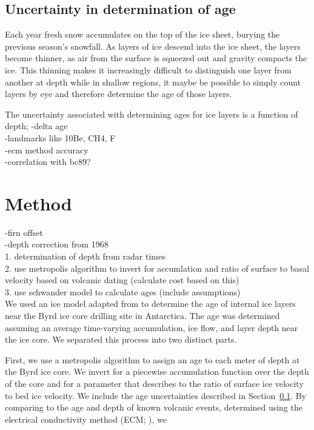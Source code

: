 \documentclass[draft,jgrga]{agutex}
\begin{document}
\subsection{Uncertainty in determination of age}\label{ageunc}

Each year fresh snow accumulates on the top of the ice sheet,
burying the previous season's snowfall. As layers of ice descend into
the ice sheet, the layers become thinner, as air from the surface is
squeezed out and gravity compacts the ice. This thinning makes it
increasingly difficult to distinguish one layer from another at
depth while in shallow regions, it maybe be possible to simply count
layers by eye and therefore determine the age of those layers. 

The uncertainty associated with determining ages for ice layers is a
function of depth;
-delta age \\
-landmarks like 10Be, CH4, F \\
-ecm method accuracy \\
-correlation with bc89? \\

\section{Method}\label{method}
-firn offset \\
-depth correction from 1968  \\
1. determination of depth from radar times \\
2. use metropolis algorithm to invert for accumlation and ratio of
surface to basal velocity based on volcanic dating (calculate cost
based on this) \\
3. use schwander model to calculate ages (include assumptions)\\


We used an ice model adapted from \citet{Schwander01} to determine the
age of internal ice layers near the Byrd ice core drilling site in
Antarctica. The age was determined assuming an average time-varying
accumulation, ice flow, and layer depth near the ice core. We
separated this process into two distinct parts.

First, we use a metropolis algorithm to assign an age to each meter of
depth at the Byrd ice core. We invert for a piecewise accumulation
function over the depth of the core and for a parameter that describes
to the ratio of surface ice velocity to bed ice velocity. We include
the age uncertainties described in Section~\ref{ageunc}. By
comparing to the age and depth of known volcanic events, determined
using the electrical conductivity method (ECM; \citet{Hammer94}), we
\end{document}
